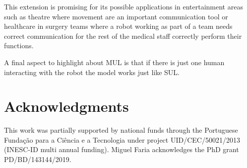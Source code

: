 \documentclass[letterpaper, 10 pt, conference]{ieeeconf}
\begin{document}
This extension is promising for its possible applications in entertainment areas such as theatre where movement are an important communication tool or healthcare in surgery teams where a robot working as part of a team needs correct communication for the rest of the medical staff correctly perform their functions.

A final aspect to highlight about \ac{MUL} is that if there is just one human interacting with the robot the model works just like \ac{SUL}.

\section*{Acknowledgments}
This work was partially supported by national funds through the Portuguese Fundação para a Ciência e a Tecnologia under project UID/CEC/50021/2013 (INESC-ID multi annual funding). Miguel Faria acknowledges the PhD grant PD/BD/143144/2019.






\end{document}
